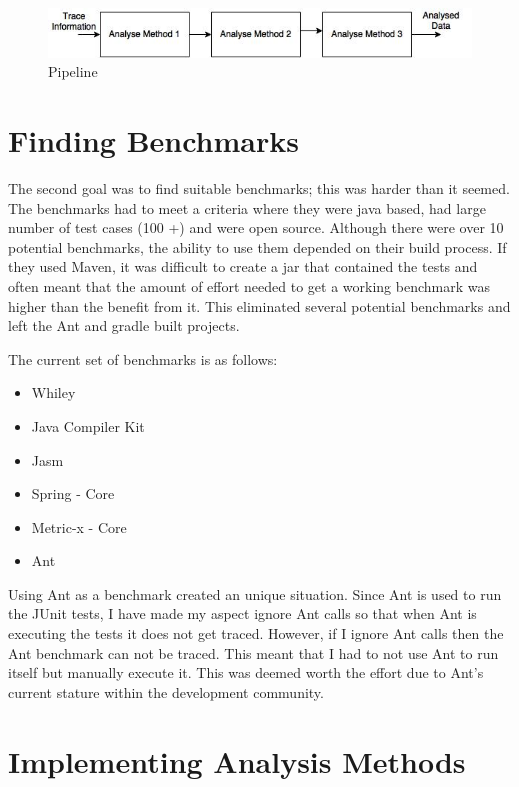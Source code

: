 \begin{figure}[h]
\includegraphics[width=\textwidth]{Pipeline.jpg}
\caption{Pipeline}
\label{fig:pipeline}
\end{figure}


\section{Finding Benchmarks}

The second goal was to find suitable benchmarks; this was harder than it seemed. The benchmarks had to meet a criteria where they were java based, had large number of test cases (100 +) and were open source. Although there were over 10 potential benchmarks, the ability to use them depended on their build process. If they used Maven, it was difficult to create a jar that contained the tests and often meant that the amount of effort needed to get a working benchmark was higher than the benefit from it. This eliminated several potential benchmarks and left the Ant and gradle built projects. 

The current set of benchmarks is as follows:

\begin{itemize}
\item Whiley
\item Java Compiler Kit
\item Jasm
\item Spring - Core
\item Metric-x - Core
\item Ant
\end{itemize}


Using Ant as a benchmark created an unique situation. Since Ant is used to run the JUnit tests, I have made my aspect ignore Ant calls so that when Ant is executing the tests it does not get traced. However, if I ignore Ant calls then the Ant benchmark can not be traced. This meant that I had to not use Ant to run itself but manually execute it. This was deemed worth the effort due to Ant’s current stature within the development community. 

\section{Implementing Analysis Methods}

